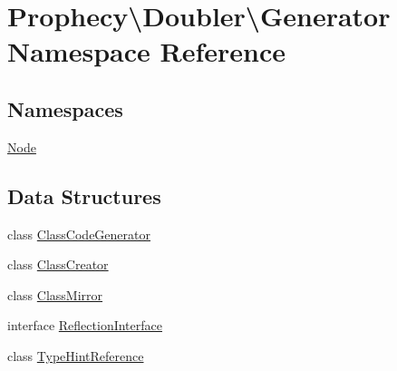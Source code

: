 \hypertarget{namespace_prophecy_1_1_doubler_1_1_generator}{}\section{Prophecy\textbackslash{}Doubler\textbackslash{}Generator Namespace Reference}
\label{namespace_prophecy_1_1_doubler_1_1_generator}
\subsection*{Namespaces}
\begin{DoxyCompactItemize}
\item 
 \mbox{\hyperlink{namespace_prophecy_1_1_doubler_1_1_generator_1_1_node}{Node}}
\end{DoxyCompactItemize}
\subsection*{Data Structures}
\begin{DoxyCompactItemize}
\item 
class \mbox{\hyperlink{class_prophecy_1_1_doubler_1_1_generator_1_1_class_code_generator}{Class\+Code\+Generator}}
\item 
class \mbox{\hyperlink{class_prophecy_1_1_doubler_1_1_generator_1_1_class_creator}{Class\+Creator}}
\item 
class \mbox{\hyperlink{class_prophecy_1_1_doubler_1_1_generator_1_1_class_mirror}{Class\+Mirror}}
\item 
interface \mbox{\hyperlink{interface_prophecy_1_1_doubler_1_1_generator_1_1_reflection_interface}{Reflection\+Interface}}
\item 
class \mbox{\hyperlink{class_prophecy_1_1_doubler_1_1_generator_1_1_type_hint_reference}{Type\+Hint\+Reference}}
\end{DoxyCompactItemize}
